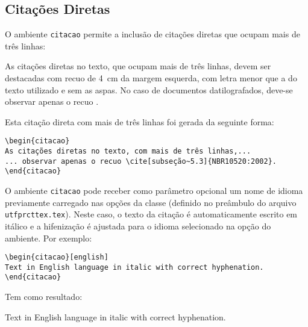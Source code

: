 \subsection{Citações Diretas}\label{sec:citacoesdiretas}

O ambiente \texttt{citacao} permite a inclusão de citações diretas que ocupam mais de três linhas:

\begin{citacao}%
As citações diretas no texto, que ocupam mais de três linhas, devem ser destacadas com recuo de \SI{4}{cm} da margem esquerda, com letra menor que a do texto utilizado e sem as aspas. No caso de documentos datilografados, deve-se observar apenas o recuo \cite[subseção 5.3]{NBR10520:2002}.
\end{citacao}

\noindent Esta citação direta com mais de três linhas foi gerada da seguinte forma:

\begin{SingleSpacing}%
\begin{verbatim}
\begin{citacao}
As citações diretas no texto, com mais de três linhas,...
... observar apenas o recuo \cite[subseção~5.3]{NBR10520:2002}.
\end{citacao}
\end{verbatim}
\end{SingleSpacing}

O ambiente \texttt{citacao} pode receber como parâmetro opcional um nome de idioma previamente carregado nas opções da classe (definido no preâmbulo do arquivo \texttt{utfprcttex.tex}). Neste caso, o texto da citação é automaticamente escrito em itálico e a hifenização é ajustada para o idioma selecionado na opção do ambiente. Por exemplo:

\begin{SingleSpacing}%
\begin{verbatim}
\begin{citacao}[english]
Text in English language in italic with correct hyphenation.
\end{citacao}
\end{verbatim}
\end{SingleSpacing}

\noindent Tem como resultado:

\begin{citacao}[english]%
Text in English language in italic with correct hyphenation.
\end{citacao}

